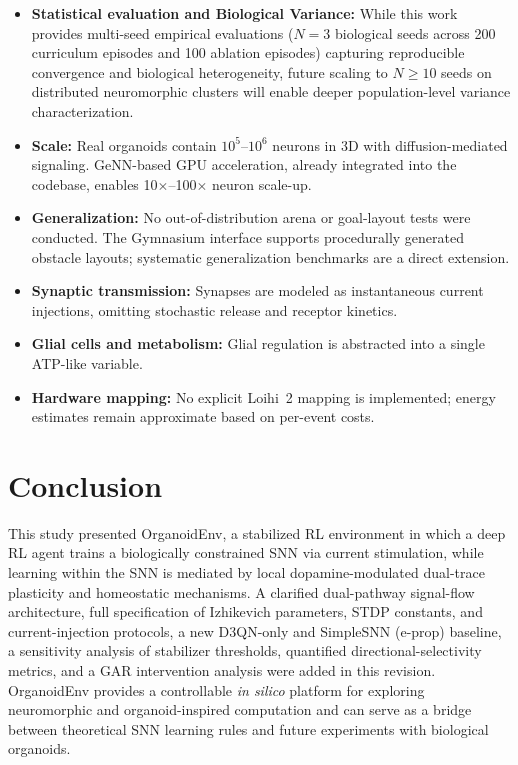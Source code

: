 \documentclass[journal,twocolumn]{IEEEtran}
\begin{document}
\begin{itemize}
\item \textbf{Statistical evaluation and Biological Variance:} While this work provides multi-seed empirical evaluations ($N=3$ biological seeds across 200 curriculum episodes and 100 ablation episodes) capturing reproducible convergence and biological heterogeneity, future scaling to $N \ge 10$ seeds on distributed neuromorphic clusters will enable deeper population-level variance characterization.
\item \textbf{Scale:} Real organoids contain $10^5$--$10^6$ neurons
      in 3D with diffusion-mediated signaling. GeNN-based GPU acceleration, 
      already integrated into the codebase, enables 10$\times$--100$\times$ neuron scale-up.
\item \textbf{Generalization:} No out-of-distribution arena or
      goal-layout tests were conducted. The Gymnasium interface supports 
      procedurally generated obstacle layouts; systematic generalization benchmarks 
      are a direct extension.
\item \textbf{Synaptic transmission:} Synapses are modeled as
      instantaneous current injections, omitting stochastic release
      and receptor kinetics.
\item \textbf{Glial cells and metabolism:} Glial regulation is
      abstracted into a single ATP-like variable.
\item \textbf{Hardware mapping:} No explicit Loihi~2 mapping is
      implemented; energy estimates remain approximate based on per-event costs.
\end{itemize}

\section{Conclusion}

This study presented OrganoidEnv, a stabilized RL environment in which
a deep RL agent trains a biologically constrained SNN via current
stimulation, while learning within the SNN is mediated by local
dopamine-modulated dual-trace plasticity and homeostatic mechanisms.
A clarified dual-pathway signal-flow architecture, full specification
of Izhikevich parameters, STDP constants, and current-injection
protocols, a new D3QN-only and SimpleSNN (e-prop) baseline, a
sensitivity analysis of stabilizer thresholds, quantified
directional-selectivity metrics, and a GAR intervention analysis were
added in this revision.  OrganoidEnv provides a controllable
\emph{in silico} platform for exploring neuromorphic and
organoid-inspired computation and can serve as a bridge between
theoretical SNN learning rules and future experiments with biological
organoids.
\end{document}
